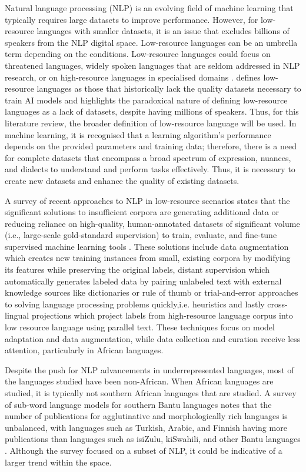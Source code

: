 \documentclass[11pt,a4paper]{article}
\begin{document}
Natural language processing (NLP) is an evolving field of machine learning that typically requires large datasets to improve performance. However, for low-resource languages with smaller datasets, it is an issue that excludes billions of speakers from the NLP digital space. Low-resource languages can be an umbrella term depending on the conditions. Low-resource languages could focus on threatened languages, widely spoken languages that are seldom addressed in NLP research, or on high-resource languages in specialised domains \citep{Hedderich2021}. \citet{Shahid2025} defines low-resource languages as those that historically lack the quality datasets necessary to train AI models and highlights the paradoxical nature of defining low-resource languages as a lack of datasets, despite having millions of speakers. Thus, for this literature review, the broader definition of low-resource language will be used. In machine learning, it is recognised that a learning algorithm's performance depends on the provided parameters and training data; therefore, there is a need for complete datasets that encompass a broad spectrum of expression, nuances, and dialects to understand and perform tasks effectively. Thus, it is necessary to create new datasets and enhance the quality of existing datasets. 

A survey of recent approaches to NLP in low-resource scenarios states that the significant solutions to insufficient corpora are generating additional data or reducing reliance on high-quality, human-annotated datasets of significant volume (i.e., large-scale gold-standard supervision) to train, evaluate, and fine-tune supervised machine learning tools \citep{Hedderich2021}. These solutions include data augmentation which creates new training instances from small, existing corpora by modifying its features while preserving the original labels, distant supervision which automatically generates labeled data by pairing unlabeled text with external knowledge sources like dictionaries or rule of thumb or trial-and-error approaches to solving language processing problems quickly,i.e. heuristics and lastly cross-lingual projections which project labels from high-resource language corpus into low resource language using parallel text. These techniques focus on model adaptation and data augmentation, while data collection and curation receive less attention, particularly in African languages.

\vspace{2em}
Despite the push for NLP advancements in underrepresented languages, most of the languages studied have been non-African. When African languages are studied, it is typically not southern African languages that are studied. A survey of sub-word language models for southern Bantu languages notes that the number of publications for agglutinative and morphologically rich languages is unbalanced, with languages such as Turkish, Arabic, and Finnish having more publications than languages such as isiZulu, kiSwahili, and other Bantu languages \citep{Kambarami2021}. Although the survey focused on a subset of NLP, it could be indicative of a larger trend within the space. 
\end{document}

